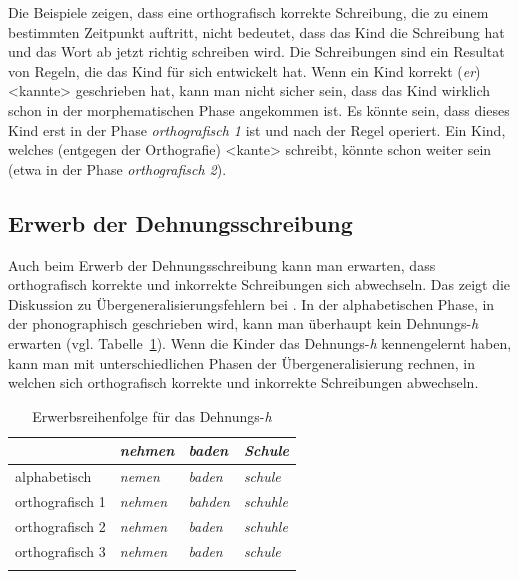 Die Beispiele zeigen, dass eine orthografisch korrekte Schreibung, die zu einem bestimmten Zeitpunkt auftritt, nicht bedeutet, dass das Kind die Schreibung  hat und das Wort ab jetzt richtig schreiben wird. Die Schreibungen sind ein Resultat von Regeln, die das Kind für sich entwickelt hat. Wenn ein Kind korrekt (\textit{er}) <kannte> geschrieben hat, kann man nicht sicher sein, dass das Kind wirklich schon in der morphematischen Phase angekommen ist. Es könnte sein, dass dieses Kind erst in der Phase \textit{orthografisch 1} ist und nach der Regel  operiert. Ein Kind, welches (entgegen der Orthografie) <kante> schreibt, könnte schon weiter sein (etwa in der Phase \textit{orthografisch 2}).

\subsection{Erwerb der Dehnungsschreibung}
Auch beim Erwerb der Dehnungsschreibung kann man erwarten, dass orthografisch korrekte und inkorrekte Schreibungen sich abwechseln. Das zeigt die Diskussion zu Übergeneralisierungsfehlern bei \citet{Thome2017}. In der alphabetischen Phase, in der phonographisch geschrieben wird, kann man überhaupt kein Dehnungs-\textit{h} erwarten (vgl. Tabelle~\ref{tab:nehmenbadenSchule}). Wenn die Kinder das Dehnungs-\textit{h} kennengelernt haben, kann man mit unterschiedlichen Phasen der Übergeneralisierung rechnen, in welchen sich orthografisch korrekte und inkorrekte Schreibungen abwechseln.

\begin{table}
\caption{\label{tab:nehmenbadenSchule} Erwerbsreihenfolge für das Dehnungs-\textit{h}}
\begin{tabular}{llll}\lsptoprule
                            & \textit{nehmen} & \textit{baden} & \textit{Schule}\\\midrule
alphabetisch       & \textit{nemen} & \textit{baden} & \textit{schule} \\
orthografisch 1   & \textit{nehmen} & \textit{bahden} & \textit{schuhle}\\
orthografisch 2   & \textit{nehmen} & \textit{baden} & \textit{schuhle}\\
orthografisch 3   & \textit{nehmen} & \textit{baden} & \textit{schule}\\\lspbottomrule
\end{tabular}
\end{table}

